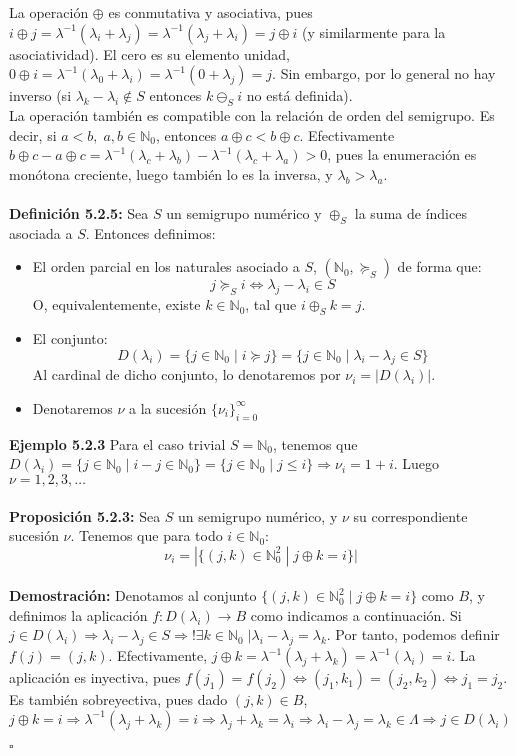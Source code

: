 \documentclass[11pt,spanish]{book}
\newcommand{\qed}{\begin{flushright} $\square$ \end{flushright}}
\begin{document}
La operación $\oplus$ es conmutativa y asociativa, pues $i\oplus j=\lambda^{-1}(\lambda_{i}+\lambda_j)=\lambda^{-1}(\lambda_{j}+\lambda_i)=j\oplus i$ (y similarmente para la asociatividad). El cero es su elemento unidad, $0\oplus i=\lambda^{-1}(\lambda_{0}+\lambda_i)=\lambda^{-1}(0+\lambda_j)=j$. Sin embargo, por lo general no hay inverso (si $\lambda_k -\lambda_i\notin S$ entonces $k\ominus_S i$ no está definida). \\

La operación también es compatible con la relación de orden del semigrupo. Es decir, si $a<b,\;a,b\in\mathbb{N}_0$, entonces $a\oplus c < b\oplus c$. Efectivamente $b\oplus c -a\oplus c = \lambda^{-1}(\lambda_c+\lambda_b)-\lambda^{-1}(\lambda_c+\lambda_a)>0$, pues la enumeración es monótona creciente, luego también lo es la inversa, y $\lambda_{b}>\lambda_a$.\\
\\\hypertarget{def5.2.5}{\textbf{Definición 5.2.5:}} Sea $S$ un semigrupo numérico y $\oplus_{S}$ la suma de índices asociada a $S$. Entonces definimos:
\begin{itemize} 
    \item El orden parcial en los naturales asociado a $S$, $(\mathbb{N}_0,\succeq_{S})$ de forma que:
    $$j\succeq_{S} i\Leftrightarrow \lambda_{j}-\lambda_{i}\in S$$
    O, equivalentemente, existe $k\in\mathbb{N}_0$, tal que $i\oplus_{S}k=j$.
    \item El conjunto:
    $$D(\lambda_i)=\{j\in \mathbb{N}_0\;|\;i\succeq j\}=\{j\in\mathbb{N}_0\;|\;\lambda_{i}-\lambda_{j}\in S\}$$
    Al cardinal de dicho conjunto, lo denotaremos por $\nu_i=|D(\lambda_i)|$. 
    \item Denotaremos $\nu$ a la sucesión $\{\nu_{i}\}_{i=0}^{\infty}$
\end{itemize}
\textbf{Ejemplo 5.2.3} Para el caso trivial $S=\mathbb{N}_0$, tenemos que $D(\lambda_i)=\{j\in\mathbb{N}_0\;|\;i-j\in \mathbb{N}_0\}=\{j\in\mathbb{N}_0\;|\; j\leq i\}\Rightarrow \nu_{i}=1+i$. Luego $\nu=1,2,3,\ldots$\\
\\\hypertarget{prop5.2.3}{\textbf{Proposición 5.2.3: }} Sea $S$ un semigrupo numérico, y $\nu$ su correspondiente sucesión $\nu$. Tenemos que para todo $i\in\mathbb{N}_0$:
$$\nu_i=|\{(j,k)\in\mathbb{N}_0^2\;|\; j\oplus k =i\}|$$
\\ \textbf{Demostración:}
Denotamos al conjunto $\{(j,k)\in\mathbb{N}_0^2\;|\; j\oplus k =i\}$ como $B$, y definimos la aplicación $f:D(\lambda_i)\rightarrow B$ como indicamos a continuación. Si $j\in D(\lambda_i)\Rightarrow \lambda_i-\lambda_j\in S\Rightarrow !\exists k\in \mathbb{N}_0\;|\lambda_i-\lambda_j=\lambda_k$. Por tanto, podemos definir $f(j)=(j,k)$. Efectivamente, $j\oplus k= \lambda^{-1}(\lambda_j+\lambda_k)=\lambda^{-1}(\lambda_i)=i$. La aplicación es inyectiva, pues $f(j_1)=f(j_2)\Leftrightarrow (j_1,k_1)=(j_2,k_2)\Leftrightarrow j_1=j_2$. Es también sobreyectiva, pues dado $(j,k)\in B$, $j\oplus k = i\Rightarrow \lambda^{-1}(\lambda_j+\lambda_k)=i\Rightarrow \lambda_j+\lambda_k=\lambda_i\Rightarrow \lambda_i-\lambda_j=\lambda_k\in \Lambda\Rightarrow j\in D(\lambda_i)$
\qed
\end{document}
